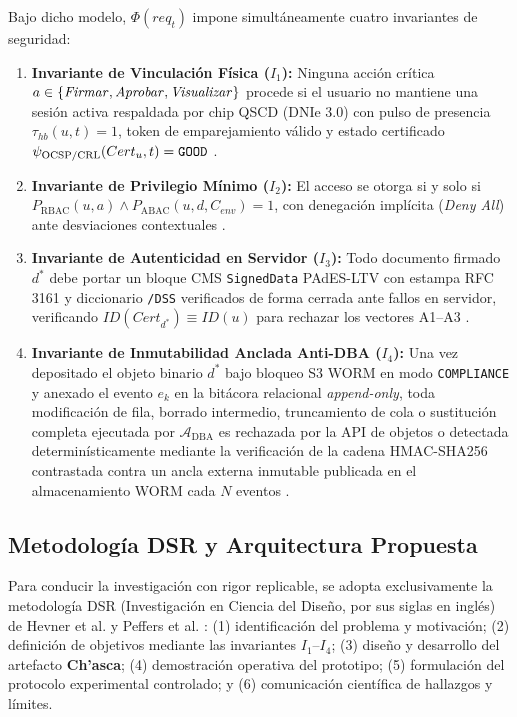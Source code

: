 \documentclass[runningheads,twocolumn]{llncs}
\begin{document}
Bajo dicho modelo, $\Phi(req_t)$ impone simultáneamente cuatro invariantes de seguridad:
\begin{enumerate}
    \item \textbf{Invariante de Vinculación Física ($I_1$):} Ninguna acción crítica $a \in \{\text{\textit{Firmar}}, \text{\textit{Aprobar}}, \text{\textit{Visualizar}}\}$ procede si el usuario no mantiene una sesión activa respaldada por chip QSCD (DNIe 3.0) con pulso de presencia $\tau_{hb}(u,t) = 1$, token de emparejamiento válido y estado certificado $\psi_{\text{OCSP/CRL}}(Cert_u,t) = \text{\texttt{GOOD}}$ \cite{liu2026,reniec2025}.
    \item \textbf{Invariante de Privilegio Mínimo ($I_2$):} El acceso se otorga si y solo si $P_{\text{RBAC}}(u, a) \wedge P_{\text{ABAC}}(u, d, C_{env}) = 1$, con denegación implícita (\textit{Deny All}) ante desviaciones contextuales \cite{soni2026,hu2014}.
    \item \textbf{Invariante de Autenticidad en Servidor ($I_3$):} Todo documento firmado $d^*$ debe portar un bloque CMS \texttt{SignedData} PAdES-LTV con estampa RFC 3161 y diccionario \texttt{/DSS} verificados de forma cerrada ante fallos en servidor, verificando $ID(Cert_{d^*}) \equiv ID(u)$ para rechazar los vectores A1--A3 \cite{doynov2026,heher2027}.
    \item \textbf{Invariante de Inmutabilidad Anclada Anti-DBA ($I_4$):} Una vez depositado el objeto binario $d^*$ bajo bloqueo S3 WORM en modo \texttt{COMPLIANCE} y anexado el evento $e_k$ en la bitácora relacional \textit{append-only}, toda modificación de fila, borrado intermedio, truncamiento de cola o sustitución completa ejecutada por $\mathcal{A}_{\text{DBA}}$ es rechazada por la API de objetos o detectada determinísticamente mediante la verificación de la cadena HMAC-SHA256 contrastada contra un ancla externa inmutable publicada en el almacenamiento WORM cada $N$ eventos \cite{soni2026,han2025}.
\end{enumerate}

\subsection{Metodología DSR y Arquitectura Propuesta}
Para conducir la investigación con rigor replicable, se adopta exclusivamente la metodología DSR (Investigación en Ciencia del Diseño, por sus siglas en inglés) de Hevner et al. \cite{hevner2004} y Peffers et al. \cite{peffers2007}: (1) identificación del problema y motivación; (2) definición de objetivos mediante las invariantes $I_1$--$I_4$; (3) diseño y desarrollo del artefacto \textbf{Ch'asca}; (4) demostración operativa del prototipo; (5) formulación del protocolo experimental controlado; y (6) comunicación científica de hallazgos y límites.
\end{document}
